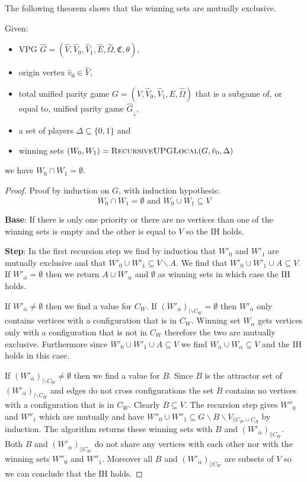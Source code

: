 The following theorem shows that the winning sets are mutually exclusive.
\begin{theorem}Given:
	\begin{itemize}
		\item VPG $\hat{G} = (\hat{V}, \hat{V}_0,\hat{V}_1,\hat{E},\hat{\Omega},\mathfrak{C},\theta)$,
		\item origin vertex $\hat{v}_0 \in \hat{V}$,
		\item total unified parity game $G = (V, \hat{V}_0, \hat{V}_1,E,\hat{\Omega})$ that is a subgame of, or equal to, unified parity game $\hat{G}_{\downarrow}$,
		\item a set of players $\Delta \subseteq \{0,1\}$ and
		\item winning sets $(W_0,W_1) = \textsc{RecursiveUPGLocal}(G,\hat{v}_0,\Delta)$
	\end{itemize}
	we have $W_0\cap W_1 = \emptyset$.
	\begin{proof}
		Proof by induction on $G$, with induction hypothesis:
		\[ W_0\cap W_1 = \emptyset\text{ and }W_0 \cup W_1 \subseteq V \]
		
		\textbf{Base}: If there is only one priority or there are no vertices than one of the winning sets is empty and the other is equal to $V$ so the IH holds.
		
		\textbf{Step}: In the first recursion step we find by induction that $W'_0$ and $W'_1$ are mutually exclusive and that $W'_0 \cup W'_1 \subseteq V\backslash A$. We find that $W'_0 \cup W'_1 \cup A \subseteq V$. If $W'_{\overline{\alpha}} = \emptyset$ then we return $A\cup W'_{\overline{\alpha}}$ and $\emptyset$ as winning sets in which case the IH holds.
		
		If $W'_{\overline{\alpha}} \neq \emptyset$ then we find a value for $C_W$. If $(W'_{\overline{\alpha}})_{|\backslash C_W} = \emptyset$ then $W'_{\overline{\alpha}}$ only contains vertices with a configuration that is in $C_W$. Winning set $W_\alpha$ gets vertices only with a configuration that is not in $C_W$ therefore the two are mutually exclusive. Furthermore since $W'_0 \cup W'_1 \cup A \subseteq V$ we find $W_{\overline{\alpha}} \cup W_\alpha \subseteq V$ and the IH holds in this case.
		
		If $(W'_{\overline{\alpha}})_{|\backslash C_W} \neq \emptyset$ then we find a value for $B$. Since $B$ is the attractor set of $(W'_{\overline{\alpha}})_{|\backslash C_W}$ and edges do not cross configurations the set $B$ contains no vertices with a configuration that is in $C_W$. Clearly $B \subseteq V$. The recursion step gives $W''_0$ and $W''_1$ which are mutually and have $W''_0 \cup W''_1 \subseteq G\backslash B \backslash V_{||C_W\cup C_B}$ by induction. The algorithm returns these winning sets with $B$ and $(W'_{\overline{\alpha}})_{||C_W}$. Both $B$ and $(W'_{\overline{\alpha}})_{||C_W}$ do not share any vertices with each other nor with the winning sets $W''_0$ and $W''_1$. Moreover all $B$ and $(W'_{\overline{\alpha}})_{||C_W}$ are subsets of $V$ so we can conclude that the IH holds.
	\end{proof}
\end{theorem}

